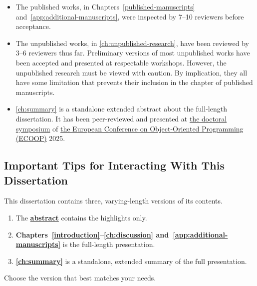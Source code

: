 \begin{itemize}

\item The published works, in Chapters~\ref{published-manuscripts}
and~\ref{app:additional-manuscripts}, were inspected by 7--10 reviewers before
acceptance.

\item The unpublished works, in \autoref{ch:unpublished-research}, have been
reviewed by 3--6 reviewers thus far. Preliminary versions of most unpublished
works have been accepted and presented at respectable workshops. However, the
unpublished research must be viewed with caution. By implication, they all have
some limitation that prevents their inclusion in the chapter of {published}
manuscripts.

\item \autoref{ch:summary} is a standalone extended abstract about the
full-length dissertation. It has been peer-reviewed and presented at
\href{https://2025.ecoop.org/track/ecoop-2025-doctoral-symposium}{the doctoral
symposium} of \href{https://2025.ecoop.org}{the European Conference on
Object-Oriented Programming (ECOOP)} 2025.

\end{itemize}

\subsection{Important Tips for Interacting With This Dissertation}
\label{subsec:tips}

This dissertation contains three, varying-length versions of its contents.

\begin{mdframed}[backgroundcolor=paperbase,linecolor=paper,nobreak=true]
\begin{enumerate}[wide, labelwidth=!, labelindent=0pt]
\item The \textbf{\hyperref[abs]{abstract}} contains the highlights only.
\item \textbf{Chapters~\ref{introduction}--\ref{ch:discussion}
and~\ref{app:additional-manuscripts}} is the full-length presentation.
\item \textbf{\autoref{ch:summary}} is a standalone, extended summary of the
full presentation.
\end{enumerate}
\end{mdframed}

Choose the version that best matches your needs.

